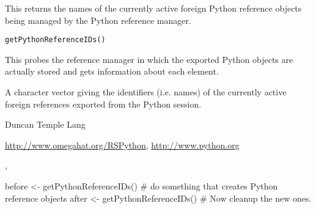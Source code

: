 \begin{Description}\relax
This returns the names of the currently active
foreign Python reference objects being managed by 
the Python reference manager.\end{Description}
\begin{Usage}
\begin{verbatim}
getPythonReferenceIDs()
\end{verbatim}
\end{Usage}
\begin{Details}\relax
This probes the reference manager in which the 
exported Python objects are actually stored
and gets information about each element.\end{Details}
\begin{Value}
A character vector giving the identifiers (i.e. names) of
the currently active foreign references exported from the Python
session.\end{Value}
\begin{Author}\relax
Duncan Temple Lang\end{Author}
\begin{References}\relax
\url{http://www.omegahat.org/RSPython},
\url{http://www.python.org}\end{References}
\begin{SeeAlso}\relax
{},
\end{SeeAlso}
\begin{Examples}
\begin{ExampleCode}

  before <- getPythonReferenceIDs()
   # do something that creates Python reference objects
  after <-  getPythonReferenceIDs()
   # Now cleanup the new ones.

\end{ExampleCode}
\end{Examples}

